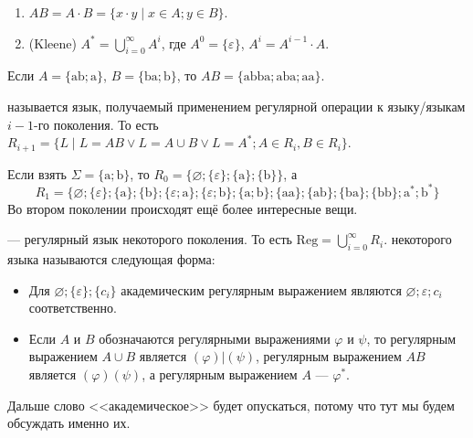 \documentclass{article}
\begin{document}
\begin{itemize}
\begin{enumerate}
            \item {} $AB=A\cdot B=\{x\cdot y\mid x\in A;y\in B\}$.
            \item {} (Kleene) $A^*=\bigcup\limits_{i=0}^\infty A^i$, где $A^0=\{\varepsilon\}$, $A^i=A^{i-1}\cdot A$.
        \end{enumerate}
        \begin{Example}
            Если $A=\{\mathrm{ab};\mathrm a\}$, $B=\{\mathrm{ba};\mathrm b\}$, то $AB=\{\mathrm{abba};\mathrm{aba};\mathrm{aa}\}$.
        \end{Example}
        \dfn {} называется язык, получаемый применением регулярной операции к языку/языкам $i-1$-го поколения. То есть $R_{i+1}=\{L\mid L=AB\lor L=A\cup B\lor L=A^*;A\in R_i,B\in R_i\}$.
        \begin{Example}
            Если взять $\Sigma=\{\mathrm a;\mathrm b\}$, то $R_0=\{\varnothing;\{\varepsilon\};\{\mathrm a\};\{\mathrm b\}\}$, а
            $$
            R_1=\{\varnothing;\{\varepsilon\};\{\mathrm a\};\{\mathrm b\};\{\varepsilon;\mathrm a\};\{\varepsilon;\mathrm b\};\{\mathrm a;\mathrm b\};\{\mathrm{aa}\};\{\mathrm{ab}\};\{\mathrm{ba}\};\{\mathrm{bb}\};\mathrm{a}^*;\mathrm{b}^*\}
            $$
            Во втором поколении происходят ещё более интересные вещи.
        \end{Example}
        \dfn {} --- регулярный язык некоторого поколения. То есть $\mathrm{Reg}=\bigcup\limits_{i=0}^\infty R_i$.
        \dfn {} некоторого языка называются следующая форма:
        \begin{itemize}
            \item Для $\varnothing;\{\varepsilon\};\{c_i\}$ академическим регулярным выражением являются $\varnothing;\varepsilon;c_i$ соответственно.
            \item Если $A$ и $B$ обозначаются регулярными выражениями $\varphi$ и $\psi$, то регулярным выражением $A\cup B$ является $(\varphi)|(\psi)$, регулярным выражением $AB$ является $(\varphi)(\psi)$, а регулярным выражением $A$ --- $\varphi^*$.
        \end{itemize}
        \begin{Comment}
            Дальше слово <<академическое>> будет опускаться, потому что тут мы будем обсуждать именно их.
        \end{Comment}
        \begin{Comment}

\end{Comment}
\end{itemize}
\end{document}
